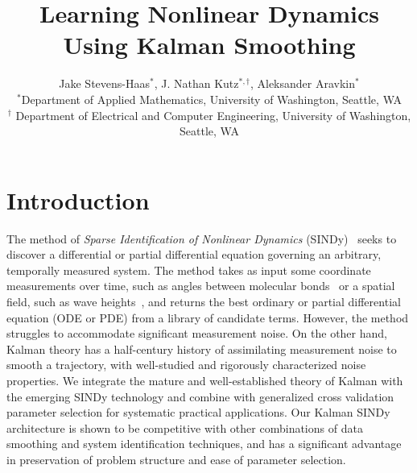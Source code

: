 \documentclass{article}
\title{Learning Nonlinear Dynamics Using Kalman Smoothing}
\author{Jake Stevens-Haas$^*$, J. Nathan Kutz$^{*,\dag}$, Aleksander Aravkin$^*$\\
{\small $^*$Department of Applied Mathematics, University of Washington, Seattle, WA} \\
{\small $^\dag$ Department of Electrical and Computer Engineering, University of Washington, Seattle, WA} }
\begin{document}
\maketitle


\section{Introduction}

The method of {\em Sparse Identification of Nonlinear Dynamics} (SINDy)~\cite{Brunton2016,brunton2022data} seeks to discover a differential or partial differential equation governing an arbitrary, temporally measured system.
The method takes as input some coordinate measurements over time, such as angles between molecular bonds~\cite{Boninsegna2018} or a spatial field, such as wave heights~\cite{Rudy2017}, and returns the best ordinary or partial differential equation (ODE or PDE) from a library of candidate terms.  However, the method struggles to accommodate significant measurement noise.  On the other hand, Kalman theory has a half-century history of assimilating measurement noise to smooth a trajectory, with well-studied and rigorously characterized noise properties. We integrate the mature and well-established theory of Kalman with the emerging SINDy technology and combine with generalized cross validation parameter selection for systematic practical applications.  Our Kalman SINDy architecture is shown to be competitive with other combinations of data smoothing and system identification techniques, and has a significant advantage in preservation of problem structure and ease of parameter selection.
\end{document}
